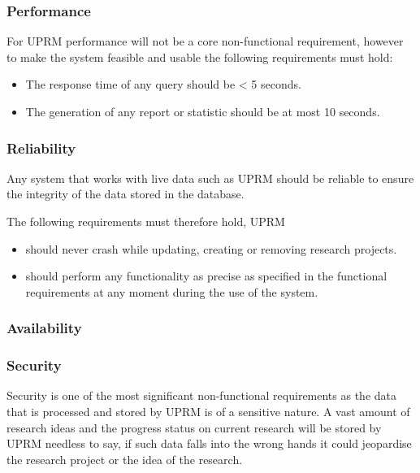 
\subsubsection{Performance}
For UPRM performance will not be a core non-functional requirement, however to make the system feasible and usable the following requirements must hold:

\begin{itemize}
	\item The response time of any query should be \textless{}  5 seconds.
	\item The generation of any report or statistic should be at most 10 seconds.
\end{itemize}

\subsubsection{Reliability}
Any system that works with live data such as UPRM should be reliable to ensure the integrity of the data stored in the database.
 
The following requirements must therefore hold, UPRM 

\begin{itemize}
	\item should never crash while updating, creating or removing research projects.
	\item should perform any functionality as precise as specified in the functional requirements at any moment during the use of the system.
\end{itemize}

\subsubsection{Availability}

\subsubsection{Security}
Security is one of the most significant non-functional requirements as the data that is processed and stored by UPRM is of a sensitive nature. 
A vast amount of research ideas and the progress status on current research will be stored by UPRM needless to say, if such data falls into the wrong hands it could jeopardise the research project or the idea of the research.\\ 

